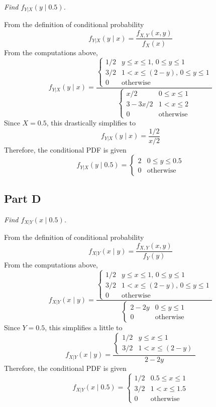 \documentclass{article}
\begin{document}
\textit{Find $ f_{Y|X}(y \mid 0.5) $.}

\bigbreak

From the definition of conditional probability
$$ f_{Y|X}(y \mid x) = \frac{f_{X,Y}(x,y)}{f_X(x)} $$
From the computations above,
$$ f_{Y|X}(y \mid x) = \frac{\begin{cases}
    1/2 & y \leq x \leq 1,\, 0 \leq y \leq 1 \\
    3/2 & 1 < x \leq (2 - y),\, 0 \leq y \leq 1 \\
    0 & \mathrm{otherwise}
\end{cases}}{\begin{cases}
    x / 2 & 0 \leq x \leq 1 \\
    3 - 3x / 2 & 1 < x \leq 2 \\
    0 & \mathrm{otherwise}
\end{cases}} $$
Since $X = 0.5$, this drastically simplifies to
$$ f_{Y|X}(y \mid x) = \frac{1/2}{x/2} $$
Therefore, the conditional PDF is given
$$ f_{Y|X}(y \mid 0.5) = \begin{cases}
    2 & 0 \leq y \leq 0.5 \\
    0 & \mathrm{otherwise}
\end{cases} $$

\subsection*{Part D}

\textit{Find $ f_{X|Y}(x \mid 0.5) $.}

\bigbreak

From the definition of conditional probability
$$ f_{X|Y}(x \mid y) = \frac{f_{X,Y}(x,y)}{f_Y(y)} $$
From the computations above,
$$ f_{X|Y}(x \mid y) = \frac{\begin{cases}
    1/2 & y \leq x \leq 1,\, 0 \leq y \leq 1 \\
    3/2 & 1 < x \leq (2 - y),\, 0 \leq y \leq 1 \\
    0 & \mathrm{otherwise}
\end{cases}}{\begin{cases}
    2 - 2y & 0 \leq y \leq 1 \\
    0 & \mathrm{otherwise}
\end{cases}} $$
Since $Y = 0.5$, this simplifies a little to
$$ f_{X|Y}(x \mid y) = \frac{\begin{cases}
    1/2 & y \leq x \leq 1 \\
    3/2 & 1 < x \leq (2 - y)
\end{cases}}{2 - 2y} $$
Therefore, the conditional PDF is given
$$ f_{X|Y}(x \mid 0.5) = \begin{cases}
    1/2 & 0.5 \leq x \leq 1 \\
    3/2 & 1 < x \leq 1.5 \\
    0 & \mathrm{otherwise}
\end{cases} $$
\end{document}
